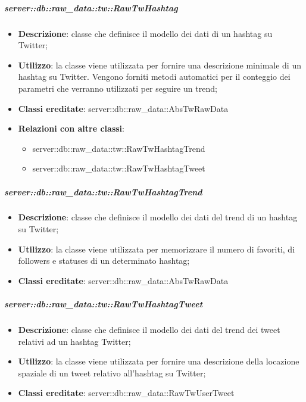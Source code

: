 		\subparagraph{server::db::raw\_data::tw::RawTwHashtag} %
		\label{subp:server_db_raw_data_tw_rawtwhashtag}
			\begin{itemize}
				\item \textbf{Descrizione}: classe che definisce il modello dei dati di un hashtag su Twitter;
				\item \textbf{Utilizzo}: la classe viene utilizzata per fornire una descrizione minimale di un hashtag su Twitter. Vengono forniti metodi automatici per il conteggio dei parametri che verranno utilizzati per seguire un trend;
				\item \textbf{Classi ereditate}: server::db::raw\_data::AbsTwRawData
				\item \textbf{Relazioni con altre classi}:
					\begin{itemize}
						\item server::db::raw\_data::tw::RawTwHashtagTrend
						\item server::db::raw\_data::tw::RawTwHashtagTweet
					\end{itemize}
			\end{itemize}


		\subparagraph{server::db::raw\_data::tw::RawTwHashtagTrend} %
		\label{subp:server_db_raw_data_tw_rawighashtagtrend}
			\begin{itemize}
				\item \textbf{Descrizione}: classe che definisce il modello dei dati del trend di un hashtag su Twitter;
				\item \textbf{Utilizzo}: la classe viene utilizzata per memorizzare il numero di favoriti, di followers e statuses di un determinato hashtag;
				\item \textbf{Classi ereditate}: server::db::raw\_data::AbsTwRawData
			\end{itemize}


		\subparagraph{server::db::raw\_data::tw::RawTwHashtagTweet} %
		\label{subp:server_db_raw_data_tw_rawtwhashtagtweet}
			\begin{itemize}
				\item \textbf{Descrizione}: classe che definisce il modello dei dati del trend dei tweet relativi ad un hashtag Twitter;
				\item \textbf{Utilizzo}: la classe viene utilizzata per fornire una descrizione della locazione spaziale di un tweet relativo all'hashtag su Twitter;
				\item \textbf{Classi ereditate}: server::db::raw\_data::RawTwUserTweet
			\end{itemize}





